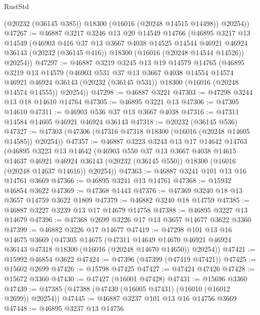 \begin{lexlean}{RustStd}
\begin{coremodule}
        (@20232 (@36145 @385))
        @18300
        (@16016 (@20248 @14515 @14498))
        @20254))
@47267 := @46887
    @3217
    @3246
    @13
    @20
    @14549
    @14766
    (@46895
      @3217
      @13
      @14549
      (@46903
        @416
        @37
        @13
        @3667
        @4038
        @14525
        @14544
        @46921
        @46924
        @36143
        (@20232 (@36145 @416))
        @18300
        (@16016 (@20248 @14544 @14526))
        @20254))
@47297 := @46887
    @3219
    @3245
    @13
    @19
    @14579
    @14765
    (@46895
      @3219
      @13
      @14579
      (@46903
        @531
        @37
        @13
        @3667
        @4038
        @14554
        @14574
        @46921
        @46924
        @36143
        (@20232 (@36145 @531))
        @18300
        (@16016 (@20248 @14574 @14555))
        @20254))
@47298 := @46887 @3221
@47303 := @47298 @3244 @13 @18 @14610 @14764
@47305 := @46895 @3221 @13
@47306 := @47305 @14610
@47311 := @46903 @536 @37 @13 @3667 @4038
@47316 := @47311 @14584 @14605 @46921 @46924 @36143
@47318 := @20232 (@36145 @536)
@47327 := @47303 (@47306 (@47316 @47318 @18300 (@16016 (@20248 @14605 @14585)) @20254))
@47357 := @46887
    @3223
    @3243
    @13
    @17
    @14642
    @14763
    (@46895
      @3223
      @13
      @14642
      (@46903
        @550
        @37
        @13
        @3667
        @4038
        @14615
        @14637
        @46921
        @46924
        @36143
        (@20232 (@36145 @550))
        @18300
        (@16016 (@20248 @14637 @14616))
        @20254))
@47363 := @46887 @3241 @101 @13 @16 @14761 @3669
@47366 := @46895 @3241 @13 @14761
@47368 := @15932 @46854 @3622
@47369 := @47368 @1443
@47376 := @47369 @3240 @18 @13 @3657 @14759 @3622 @1809
@47379 := @46882 @3240 @18 @14759
@47385 := @46887 @3227 @3239 @13 @17 @14679 @14758
@47388 := @46895 @3227 @13 @14679
@47396 := @47368 @2699 @3226 @17 @13 @3657 @14677 @3622 @3360
@47399 := @46882 @3226 @17 @14677
@47419 := @47298
    @101
    @13
    @16
    @14675
    @3669
    (@47305
      @14675
      (@47311
        @14649
        @14670
        @46921
        @46924
        @36143
        @47318
        @18300
        (@16016 (@20248 @14670 @14650))
        @20254))
@47421 := @15992 @46854 @3622
@47424 := @47396 (@47399 (@47419 @47421))
@47425 := @15602 @2699
@47426 := @15798 @47425
@47427 := @47424 @47426
@47428 := @15672 @3360
@47430 := @47427 (@16001 @47428)
@47431 := @15696 @3360
@47439 := @47385 (@47388 (@47430 (@16005 @47431) (@16010 (@16012 @2699)) @20254))
@47445 := @46887 @3237 @101 @13 @16 @14756 @3669
@47448 := @46895 @3237 @13 @14756

\end{coremodule}
\end{lexlean}
